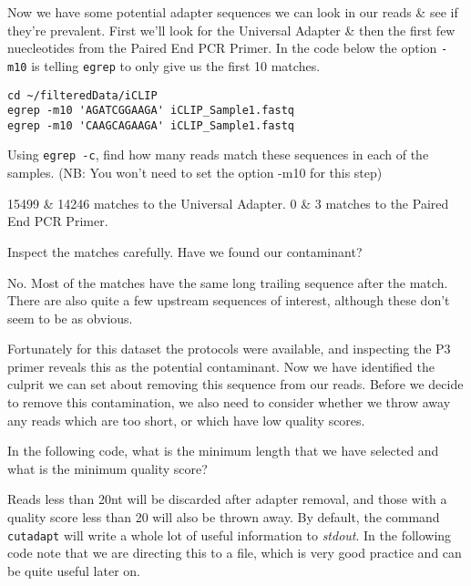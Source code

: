 \begin{steps}
Now we have some potential adapter sequences we can look in our reads \& see if they're prevalent.
First we'll look for the Universal Adapter \& then the first few nuecleotides from the Paired End PCR Primer.
In the code below the option \texttt{-m10} is telling \texttt{egrep} to only give us the first 10 matches.
\begin{lstlisting}
cd ~/filteredData/iCLIP
egrep -m10 'AGATCGGAAGA' iCLIP_Sample1.fastq
egrep -m10 'CAAGCAGAAGA' iCLIP_Sample1.fastq
\end{lstlisting}
\end{steps}

\begin{questions}
Using \texttt{egrep -c}, find how many reads match these sequences in each of the samples.
(NB: You won't need to set the option -m10 for this step)\\
\begin{answer}
15499 \& 14246 matches to the Universal Adapter.
0 \& 3 matches to the Paired End PCR Primer.\\
\end{answer}

Inspect the matches carefully.
Have we found our contaminant? \\
\begin{answer}
No. 
Most of the matches have the same long trailing sequence after the match.
There are also quite a few upstream sequences of interest, although these don't seem to be as obvious.
\end{answer}
\end{questions}

Fortunately for this dataset the protocols were available, and inspecting the P3 primer reveals this as the potential contaminant.
Now we have identified the culprit we can set about removing this sequence from our reads.
Before we decide to remove this contamination, we also need to consider whether we throw away any reads which are too short, or which have low quality scores.

\begin{questions}
In the following code, what is the minimum length that we have selected and what is the minimum quality score?\\
\begin{answer}
Reads less than 20nt will be discarded after adapter removal, and those with a quality score less than 20 will also be thrown away.
By default, the command \texttt{cutadapt} will write a whole lot of useful information to \textit{stdout}.
In the following code note that we are directing this to a file, which is very good practice and can be quite useful later on.
\end{answer}
\end{questions}

